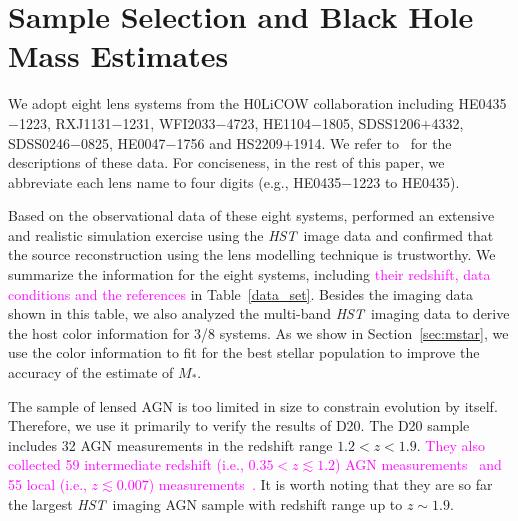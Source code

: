 \documentclass[fleqn,usenatbib]{mnras}
\newcommand{\hst}{{\it HST}}
\newcommand{\mstar}{{$M_*$}}
\newcommand{\pink}[1]{{\textcolor{magenta}{#1}}}
\begin{document}
\section{Sample Selection and Black Hole Mass Estimates}\label{sec:sample_select}
We adopt eight lens systems from the H0LiCOW collaboration including HE0435$-$1223, RXJ1131$-$1231, WFI2033$-$4723, HE1104$-$1805, SDSS1206$+$4332, SDSS0246$-$0825, HE0047$-$1756 and HS2209$+$1914. We refer to~\citet{Suyu2017, Ding2017a} for the descriptions of these data. For conciseness, in the rest of this paper, we abbreviate each lens name to four digits (e.g., HE0435$-$1223 to HE0435). 

Based on the observational data of these eight systems, \citet{Ding2017a} performed an extensive and realistic simulation exercise using the \hst\ image data and confirmed that the source reconstruction using the lens modelling technique is trustworthy. We summarize the information for the eight systems, including \pink{their redshift, data conditions and the references} in Table~\ref{data_set}.
Besides the imaging data shown in this table, we also analyzed the multi-band \hst\ imaging data to derive the host color information for 3/8 systems. As we show in Section~\ref{sec:mstar}, we use the color information to fit for the best stellar population to improve the accuracy of the estimate of \mstar. 

The sample of lensed AGN is too limited in size to constrain evolution by itself. Therefore, we use it primarily to verify the results of D20.  The D20 sample includes 32 AGN measurements in the redshift range $1.2<z<1.9$. \pink{They also collected 59 intermediate redshift (i.e., $0.35<z\lesssim1.2$) AGN measurements~\citep{Bennert11, SS13, Cisternas2011} and 55 local (i.e., $z\lesssim0.007$) measurements~\citep{Bennert++2011, H+R04}.} It is worth noting that they are so far the largest \hst\ imaging AGN sample with redshift range up to $z\sim1.9$. 
 
\end{document}
